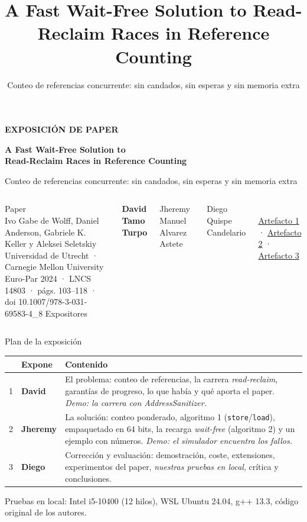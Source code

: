 \documentclass[aspectratio=169,11pt]{beamer}
\title{A Fast Wait-Free Solution to Read-Reclaim Races in Reference Counting}
\subtitle{Conteo de referencias concurrente: sin candados, sin esperas y sin memoria extra}
\date{}
\begin{document}
{
\begin{frame}[plain]
  \vspace*{6mm}
  {\color{acento}\small\bfseries EXPOSICIÓN DE PAPER}\par\smallskip
  {\fontsize{24}{28}\selectfont\bfseries A Fast Wait-Free Solution to\\ Read-Reclaim Races in Reference Counting\par}
  \medskip
  {\large\color{gris}Conteo de referencias concurrente: sin candados, sin esperas y sin memoria extra\par}
  \vfill
  \begin{columns}[T]
    {\small\color{gris}Paper}\\
    Ivo Gabe de Wolff, Daniel Anderson, Gabriele K. Keller y Aleksei Seletskiy\\
    {\small Universidad de Utrecht · Carnegie Mellon University}\\
    {\small Euro-Par 2024 · LNCS 14803 · págs. 103–118 · doi 10.1007/978-3-031-69583-4\_8}
    {\small\color{gris}Expositores}\\[2pt]
    {\normalsize\bfseries David Tamo Turpo\par Jheremy Manuel Alvarez Astete\par Diego Quispe Candelario\par}
    \\[2pt]
    {\small\href{https://claude.ai/artifact/YBS98Wz8SmSYWHca2YbHF6}{Artefacto 1} · \href{https://claude.ai/artifact/EQJd2aXZUYVX1Zio4DqFwH}{Artefacto 2} · \href{https://claude.ai/artifact/VVGviffH178bBZ6tGSAnKZ}{Artefacto 3}}
  \end{columns}
  \vspace*{4mm}
\end{frame}}

\begin{frame}{Plan de la exposición}
  \renewcommand{\arraystretch}{1.25}\small
  \begin{tabularx}{\linewidth}{@{}l l X@{}}
    \toprule
    & \textbf{Expone} & \textbf{Contenido}\\
    \midrule
    1 & \textbf{David} & El problema: conteo de referencias, la carrera \emph{read-reclaim}, garantías de progreso, lo que había y qué aporta el paper. \emph{Demo: la carrera con AddressSanitizer.}\\
    2 & \textbf{Jheremy} & La solución: conteo ponderado, algoritmo 1 (\texttt{store}/\texttt{load}), empaquetado en 64 bits, la recarga \emph{wait-free} (algoritmo 2) y un ejemplo con números. \emph{Demo: el simulador encuentra los fallos.}\\
    3 & \textbf{Diego} & Corrección y evaluación: demostración, coste, extensiones, experimentos del paper, \emph{nuestras pruebas en local}, crítica y conclusiones.\\
    \bottomrule
  \end{tabularx}
  \vfill
  {\footnotesize\color{gris}Pruebas en local: Intel i5-10400 (12 hilos), WSL Ubuntu 24.04, g++ 13.3, código original de los autores.}
\end{frame}
\end{document}
